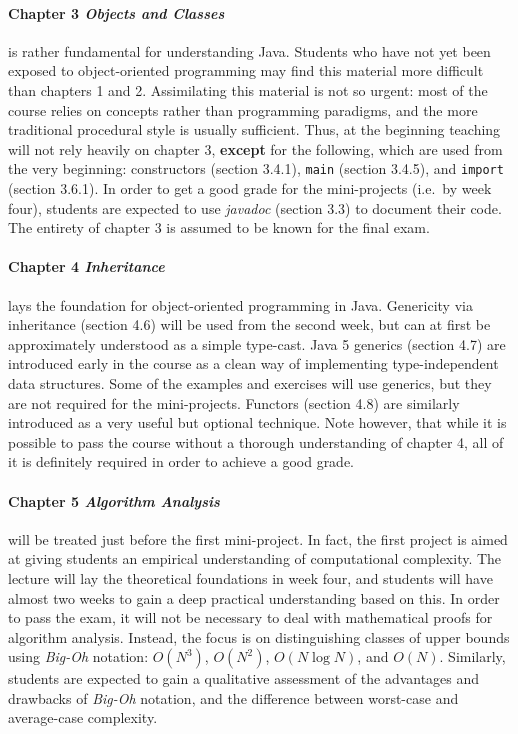 \documentclass[a4paper,twoculumn,10pt]{article}
\begin{document}
\paragraph{Chapter 3 \emph{Objects and Classes}} is rather fundamental for understanding Java.
Students who have not yet been exposed to object-oriented programming may find this material more difficult than chapters 1 and 2.
Assimilating this material is not so urgent:
most of the course relies on concepts rather than programming paradigms, and the more traditional procedural style is usually sufficient.
Thus, at the beginning teaching will not rely heavily on chapter 3, \textbf{except} for the following, which are used from the very beginning:
constructors (section 3.4.1), \texttt{main} (section 3.4.5), and \texttt{import} (section 3.6.1).
In order to get a good grade for the mini-projects (i.e.\ by week four), students are expected to use \emph{javadoc} (section 3.3) to document their code.
The entirety of chapter 3 is assumed to be known for the final exam.

\paragraph{Chapter 4 \emph{Inheritance}} lays the foundation for object-oriented programming in Java.
Genericity via inheritance (section 4.6) will be used from the second week, but can at first be approximately understood as a simple type-cast.
Java 5 generics (section 4.7) are introduced early in the course as a clean way of implementing type-independent data structures.
Some of the examples and exercises will use generics, but they are not required for the mini-projects.
Functors (section 4.8) are similarly introduced as a very useful but optional technique.
Note however, that while it is possible to pass the course without a thorough understanding of chapter 4, all of it is definitely required in order to achieve a good grade.

\paragraph{Chapter 5 \emph{Algorithm Analysis}} will be treated just before the first mini-project.
In fact, the first project is aimed at giving students an empirical understanding of computational complexity.
The lecture will lay the theoretical foundations in week four, and students will have almost two weeks to gain a deep practical understanding based on this.
In order to pass the exam, it will not be necessary to deal with mathematical proofs for algorithm analysis.
Instead, the focus is on distinguishing classes of upper bounds using \emph{Big-Oh} notation: $O(N^3)$, $O(N^2)$, $O(N\log N)$, and $O(N)$.
Similarly, students are expected to gain a qualitative assessment of the advantages and drawbacks of \emph{Big-Oh} notation, and the difference between worst-case and average-case complexity.
\end{document}

